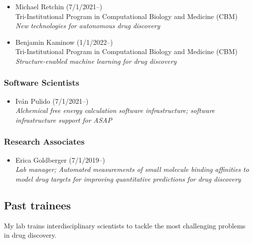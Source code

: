\documentclass[10pt]{article}
\begin{document}
\begin{itemize}
  \item Michael Retchin (7/1/2021--) \\
  Tri-Institutional Program in Computational Biology and Medicine (CBM)\\
  \emph{New technologies for autonomous drug discovery}

  \item Benjamin Kaminow (1/1/2022--)\\
  Tri-Institutional Program in Computational Biology and Medicine (CBM)\\
  \emph{Structure-enabled machine learning for drug discovery}

\end{itemize}

\subsubsection*{Software Scientists}

\begin{itemize}
  \item Iv\'{a}n Pulido (7/1/2021--)\\
  \emph{Alchemical free energy calculation software infrastructure; software infrastructure support for ASAP}

\end{itemize}


\subsubsection*{Research Associates}

\begin{itemize}
  \item Erica Goldberger (7/1/2019--)\\
  \emph{Lab manager; Automated measurements of small molecule binding affinities to model drug targets for improving quantitative predictions for drug discovery}

\end{itemize}

\eject

\subsection*{Past trainees}

My lab trains interdisciplinary scientists to tackle the most challenging problems in drug discovery.
\end{document}
